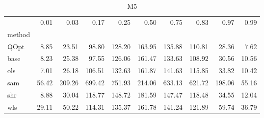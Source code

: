 \begin{table}
\caption{M5}
\label{ }
\begin{tabular}{lrrrrrrrrr}
\toprule
 & 0.01 & 0.03 & 0.17 & 0.25 & 0.50 & 0.75 & 0.83 & 0.97 & 0.99 \\
method &  &  &  &  &  &  &  &  &  \\
\midrule
QOpt & 8.85 & 23.51 & 98.80 & 128.20 & 163.95 & 135.88 & 110.81 & 28.36 & 7.62 \\
base & 8.23 & 25.38 & 97.55 & 126.06 & 161.47 & 133.63 & 108.92 & 30.56 & 10.56 \\
ols & 7.01 & 26.18 & 106.51 & 132.63 & 161.87 & 141.63 & 115.85 & 33.82 & 10.42 \\
sam & 56.42 & 209.26 & 699.42 & 751.93 & 214.06 & 633.13 & 621.72 & 198.06 & 55.16 \\
shr & 8.88 & 30.04 & 118.77 & 148.72 & 181.59 & 147.47 & 118.48 & 34.55 & 12.04 \\
wls & 29.11 & 50.22 & 114.31 & 135.37 & 161.78 & 141.24 & 121.89 & 59.74 & 36.79 \\
\bottomrule
\end{tabular}
\end{table}
